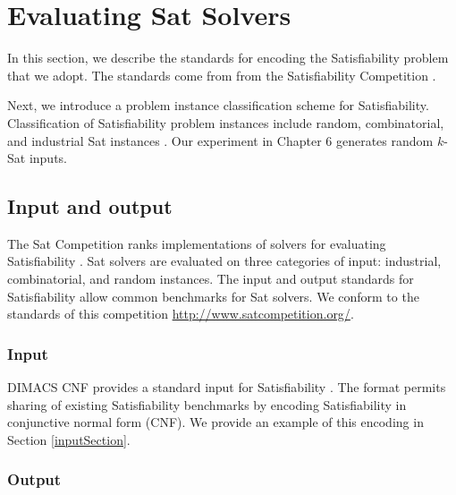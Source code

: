 \section{Evaluating {\sc Sat} Solvers}

	
	In this section, we describe the standards for encoding the {\sc Satisfiability} problem that we adopt.  The standards come from from the {\sc Satisfiability} Competition \cite{dimacsFormat, satcompetition}.  
	
	Next, we introduce a problem instance classification scheme for {\sc Satisfiability}.  Classification of {\sc Satisfiability} problem instances include random, combinatorial, and industrial {\sc Sat} instances \cite{satcompetition}.  Our experiment in Chapter 6 generates random $k$-{\sc Sat} inputs.

	\subsection{Input and output}
	
	
 The {\sc Sat} Competition ranks implementations of solvers for evaluating {\sc Satisfiability} \cite{satcompetition}.  {\sc Sat} solvers are evaluated on three categories of input: industrial, combinatorial, and random instances.  The input and output standards for {\sc Satisfiability} allow common benchmarks for {\sc Sat} solvers.  We conform to the standards of this competition \url{http://www.satcompetition.org/}.  
 

	
		\subsubsection{Input}
		
DIMACS CNF provides a standard input for {\sc Satisfiability} \cite{dimacsFormat}.  The format permits sharing of existing {\sc Satisfiability} benchmarks by encoding {\sc Satisfiability} in conjunctive normal form (CNF).  We provide an example of this encoding in Section \ref{inputSection}.
		
		\subsubsection{Output}
		
